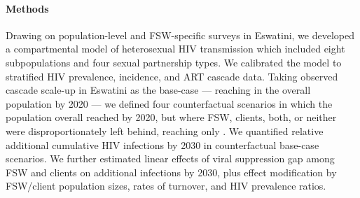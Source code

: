 \paragraph{Methods}
Drawing on population-level and FSW-specific surveys in Eswatini,
we developed a compartmental model of heterosexual HIV transmission
which included eight subpopulations and four sexual partnership types.
We calibrated the model to stratified HIV prevalence, incidence, and ART cascade data.
Taking observed cascade scale-up in Eswatini as the base-case
--- reaching \cashi in the overall population by 2020 ---
we defined four counterfactual scenarios in which
the population overall reached \casmd by 2020,
but where FSW, clients, both, or neither
were disproportionately left behind, reaching only \caslo.
We quantified relative additional cumulative HIV infections by 2030
in counterfactual \vs base-case scenarios.
We further estimated linear effects of
viral suppression gap among FSW and clients on additional infections by 2030, plus
effect modification by FSW/client population sizes, rates of turnover, and HIV prevalence ratios.
